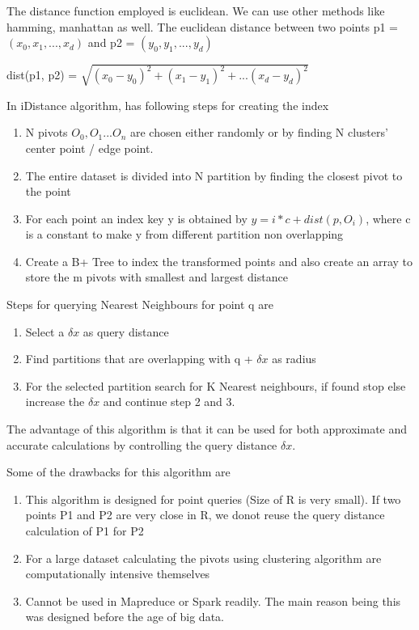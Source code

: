 \documentclass[conference]{IEEEtran}
\begin{document}
The distance function employed is euclidean. We can use other methods
like hamming, manhattan as well. The euclidean distance between two
points p1 = $(x_0, x_1, ... , x_d)$ and p2 = $(y_0, y_1, ..., y_d)$

\bigskip
dist(p1, p2) = $\sqrt{(x_0 - y_0)^2 + (x_1 - y_1)^2 + ... (x_d - y_d)^2}$
\bigskip

In iDistance algorithm, has following steps for creating the index
\begin{enumerate}
\item N pivots $O_0, O_1 ... O_n$ are chosen either randomly or by finding N clusters'
  center point / edge point.
\item The entire dataset is divided into N partition by finding the
  closest pivot to the point
\item For each point an index key y is obtained by
$y = i*c + dist(p, O_i)$, where c is a constant to make y from
different partition non overlapping
\item Create a B+ Tree to index the transformed points and also create
  an array to store the m pivots with smallest and largest distance
\end{enumerate}

\bigskip

Steps for querying Nearest Neighbours for point q are
\begin{enumerate}
\item Select a $\delta{x}$ as query distance
\item Find partitions that are overlapping with q + $\delta{x}$ as
  radius
\item For the selected partition search for K Nearest neighbours, if
  found stop else increase the $\delta{x}$ and continue step 2 and
  3.
\end{enumerate}

\bigskip
The advantage of this algorithm is that it can be used for both
approximate and accurate calculations by controlling the query
distance $\delta{x}$.

Some of the drawbacks for this algorithm are
\begin{enumerate}
\item This algorithm is designed for point queries (Size of R
  is very small). If two points P1 and P2 are very close in R, we donot reuse the query
distance calculation of P1 for P2
\item For a large dataset calculating the pivots using clustering algorithm are
  computationally intensive themselves
\item Cannot be used in Mapreduce or Spark readily. The main reason being this
  was designed before the age of big data.
\end{enumerate}
\end{document}
